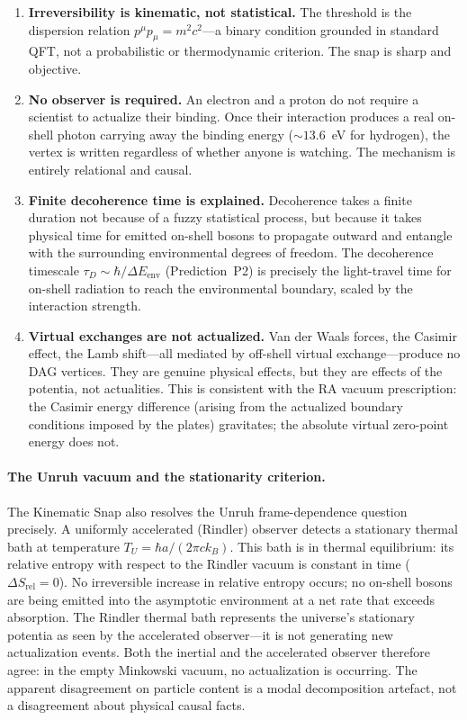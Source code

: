 \documentclass[11pt,a4paper]{article}
\theoremstyle{plain}
\theoremstyle{definition}
\theoremstyle{remark}
\begin{document}
\begin{enumerate}[leftmargin=*]
  \item \textbf{Irreversibility is kinematic, not statistical.} The threshold is
  the dispersion relation $p^{\mu}p_{\mu} = m^{2}c^{2}$---a binary condition
  grounded in standard QFT, not a probabilistic or thermodynamic criterion. The
  snap is sharp and objective.

  \item \textbf{No observer is required.} An electron and a proton do not require
  a scientist to actualize their binding. Once their interaction produces a real
  on-shell photon carrying away the binding energy ($\sim 13.6$~eV for hydrogen),
  the vertex is written regardless of whether anyone is watching. The mechanism
  is entirely relational and causal.

  \item \textbf{Finite decoherence time is explained.} Decoherence takes a finite
  duration not because of a fuzzy statistical process, but because it takes
  physical time for emitted on-shell bosons to propagate outward and entangle with
  the surrounding environmental degrees of freedom. The decoherence timescale
  $\tau_D \sim \hbar / \Delta E_{\mathrm{env}}$ (Prediction~P2) is precisely the
  light-travel time for on-shell radiation to reach the environmental boundary,
  scaled by the interaction strength.

  \item \textbf{Virtual exchanges are not actualized.} Van der Waals forces, the
  Casimir effect, the Lamb shift---all mediated by off-shell virtual
  exchange---produce no DAG vertices. They are genuine physical effects, but they
  are effects of the potentia, not actualities. This is consistent with the RA
  vacuum prescription: the Casimir energy difference (arising from the actualized
  boundary conditions imposed by the plates) gravitates; the absolute virtual
  zero-point energy does not.
\end{enumerate}

\paragraph{The Unruh vacuum and the stationarity criterion.}
The Kinematic Snap also resolves the Unruh frame-dependence question precisely.
A uniformly accelerated (Rindler) observer detects a stationary thermal bath at
temperature $T_U = \hbar a / (2\pi c k_B)$. This bath is in thermal equilibrium:
its relative entropy with respect to the Rindler vacuum is constant in time
($\Delta S_{\mathrm{rel}} = 0$). No irreversible increase in relative entropy
occurs; no on-shell bosons are being emitted into the asymptotic environment at
a net rate that exceeds absorption. The Rindler thermal bath represents the
universe's stationary potentia as seen by the accelerated observer---it is not
generating new actualization events. Both the inertial and the accelerated
observer therefore agree: in the empty Minkowski vacuum, no actualization is
occurring. The apparent disagreement on particle content is a modal decomposition
artefact, not a disagreement about physical causal facts.
\end{document}
